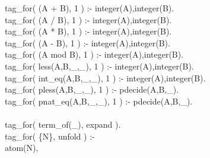 \documentclass[11pt]{report}
\begin{document}
\begin{sf}
\begin{tabbing}
tag\_\hspace{0.1em}for( (A + B), 1 ) :- integer(A),integer(B).\\[-0.15ex]
tag\_\hspace{0.1em}for( (A / B), 1 ) :- integer(A),integer(B).\\[-0.15ex]
tag\_\hspace{0.1em}for( (A * B), 1 ) :- integer(A),integer(B).\\[-0.15ex]
tag\_\hspace{0.1em}for( (A - B), 1 ) :- integer(A),integer(B).\\[-0.15ex]
tag\_\hspace{0.1em}for( (A mod B), 1 ) :- integer(A),integer(B).\\[-0.15ex]
tag\_\hspace{0.1em}for( less(A,B,\_\hspace{0.1em},\_\hspace{0.1em}), 1 ) :- integer(A),integer(B).\\[-0.15ex]
tag\_\hspace{0.1em}for( int\_\hspace{0.1em}eq(A,B,\_\hspace{0.1em},\_\hspace{0.1em}), 1 ) :- integer(A),integer(B).\\[-0.15ex]
tag\_\hspace{0.1em}for( pless(A,B,\_\hspace{0.1em},\_\hspace{0.1em}), 1 ) :- pdecide(A,B,\_\hspace{0.1em}).\\[-0.15ex]
tag\_\hspace{0.1em}for( pnat\_\hspace{0.1em}eq(A,B,\_\hspace{0.1em},\_\hspace{0.1em}), 1 ) :- pdecide(A,B,\_\hspace{0.1em}).\\[-0.7ex]
\\[-0.15ex]
tag\_\hspace{0.1em}for( term\_\hspace{0.1em}of(\_\hspace{0.1em}), expand ).\\[-0.15ex]
tag\_\hspace{0.1em}for( \{N\}, unfold ) :-\\[-0.15ex]
\hspace{2em}atom(N),\\[-0.15ex]

\end{tabbing}
\end{sf}
\end{document}
